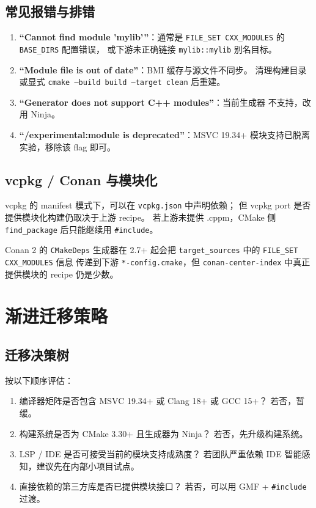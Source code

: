 \documentclass[12pt,a4paper,fontset=fandol]{ctexbook}
\newcommand{\flag}[1]{\texttt{#1}}
\begin{document}
\section{常见报错与排错}

\begin{warning}[title=CMake 模块化的典型错误]
\begin{enumerate}
  \item \textbf{“Cannot find module 'mylib'”}：通常是
        \flag{FILE\_SET CXX\_MODULES} 的 \flag{BASE\_DIRS} 配置错误，
        或下游未正确链接 \flag{mylib::mylib} 别名目标。
  \item \textbf{“Module file is out of date”}：BMI 缓存与源文件不同步。
        清理构建目录或显式 \flag{cmake --build build --target clean} 后重建。
  \item \textbf{“Generator does not support C++ modules”}：当前生成器
        不支持，改用 Ninja。
  \item \textbf{“/experimental:module is deprecated”}：MSVC 19.34+
        模块支持已脱离实验，移除该 flag 即可。
\end{enumerate}
\end{warning}

\section{vcpkg / Conan 与模块化}

vcpkg 的 manifest 模式下，可以在 \texttt{vcpkg.json} 中声明依赖；
但 vcpkg port 是否提供模块化构建仍取决于上游 recipe。
若上游未提供 .cppm，CMake 侧 \flag{find\_package} 后只能继续用
\flag{\#include}。

Conan 2 的 \texttt{CMakeDeps} 生成器在 2.7+ 起会把
\flag{target\_sources} 中的 \flag{FILE\_SET CXX\_MODULES} 信息
传递到下游 \texttt{*-config.cmake}，但 \texttt{conan-center-index}
中真正提供模块的 recipe 仍是少数。

\chapter{渐进迁移策略}

\section{迁移决策树}

\begin{guideline}[title=是否启用 Modules]
按以下顺序评估：
\begin{enumerate}
  \item 编译器矩阵是否包含 MSVC 19.34+ 或 Clang 18+ 或 GCC 15+？
        若否，暂缓。
  \item 构建系统是否为 CMake 3.30+ 且生成器为 Ninja？
        若否，先升级构建系统。
  \item LSP / IDE 是否可接受当前的模块支持成熟度？
        若团队严重依赖 IDE 智能感知，建议先在内部小项目试点。
  \item 直接依赖的第三方库是否已提供模块接口？
        若否，可以用 GMF + \flag{\#include} 过渡。
\end{enumerate}
\end{guideline}
\end{document}
